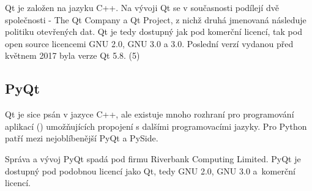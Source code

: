 Qt je založen na jazyku C++. Na vývoji Qt se v současnosti podílejí
dvě společnosti - The Qt Company a Qt Project, z nichž druhá jmenovaná
následuje politiku otevřených dat. Qt je tedy dostupný jak pod
komerční licencí, tak pod open source licencemi GNU  2.0, GNU
 3.0 a  3.0. Poslední verzí vydanou před květnem 2017
byla verze Qt 5.8. (5)


\subsection{PyQt} Qt je sice psán v jazyce C++, ale existuje mnoho
rozhraní pro programování aplikací () umožňujících propojení s
dalšími programovacími jazyky. Pro Python patří mezi nejoblíbenější
PyQt a PySide.

Správa a vývoj PyQt spadá pod firmu Riverbank Computing Limited. PyQt
je dostupný pod podobnou licencí jako Qt, tedy GNU  2.0, GNU
 3.0 a~komerční licencí.


